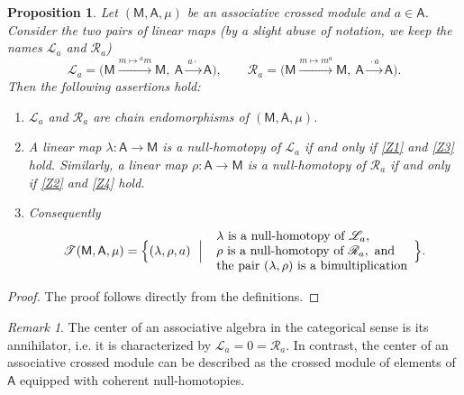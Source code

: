 \documentclass[12pt,reqno]{amsart}
\theoremstyle{plain}
\newtheorem{proposition}[theorem]{Proposition}
\theoremstyle{definition}
\theoremstyle{remark}
\newtheorem{remark}[theorem]{Remark}
\newcommand{\lact}[2]{{}^{#1}\!#2}
\newcommand{\ract}[2]{#1^{#2}}
\newcommand{\A}{\ensuremath{\mathsf{A}}}
\newcommand{\MM}{\ensuremath{\mathsf{M}}}
\newcommand{\T}{\ensuremath{\mathcal{T}}}
\newcommand{\LL}{\ensuremath{\mathcal{L}}}
\newcommand{\RR}{\ensuremath{\mathcal{R}}}
\numberwithin{equation}{section}
\begin{document}
\begin{proposition}\label{prop:homotopy}
	Let $(\MM,\A,\mu)$ be an associative crossed module and $a\in\A$. Consider the two pairs of linear maps (by a slight abuse of notation, we keep the names $\LL_a$ and $\RR_a$)
	\[
	\LL_a=\bigl(\MM \xrightarrow{m\mapsto\lact{a}{m}} \MM,\ \A \xrightarrow{ \, a\cdot \ } \A\bigr),
	 \qquad \RR_a=\bigl(\MM \xrightarrow{m\mapsto\ract{m}{a}} \MM,\ \A \xrightarrow{ \, \cdot a  \ } \A \bigr).
	\]
	Then the following assertions hold:
	\begin{enumerate}
		\item $\LL_a$ and $\RR_a$  are chain endomorphisms of $(\MM,\A,\mu)$.
		\item A linear map $\lambda \colon\A\to\MM$ is a null-homotopy of $\LL_a$ if and
		only if  \eqref{Z1}  and \eqref{Z3}  hold. Similarly,  a linear map $\rho \colon\A\to\MM$ is a null-homotopy of $\RR_a$ if and only if  \eqref{Z2}
		and \eqref{Z4} hold. 
		\item Consequently
		\[
		\T(\MM,\A,\mu)=\Bigl\{(\lambda,\rho,a)\ \Bigm|\
		\begin{array}{l}
			\lambda \ \text{is a null-homotopy of}\ \LL_a,\\
			\rho\ \text{is a null-homotopy of} \ \RR_a, \ \text{and}\\
			\text{the pair}\ (\lambda,\rho) \ \text{is a bimultiplication}
		\end{array}\Bigr\}.
		\]
	\end{enumerate}
\end{proposition}
\begin{proof}
	The proof follows directly from the definitions.
\end{proof}

\begin{remark}
The center of an associative algebra in the categorical sense is its annihilator, i.e. it is characterized  by
$\LL_a=0=\RR_a$. In contrast, the center of an associative  crossed module can be described as the crossed module of elements of $\A$ equipped with coherent null-homotopies.
\end{remark}

\end{document}
